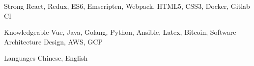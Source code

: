 

\begin{cvskills}

  \cvskill
    {Strong} %
    {React, Redux, ES6, Emscripten, Webpack, HTML5, CSS3, Docker, Gitlab CI} %

  \cvskill
    {Knowledgeable} %
    {Vue, Java, Golang, Python, Ansible, Latex, Bitcoin, Software Architecture Design, AWS, GCP} %

  \cvskill
    {Languages} %
    {Chinese, English} %

\end{cvskills}
